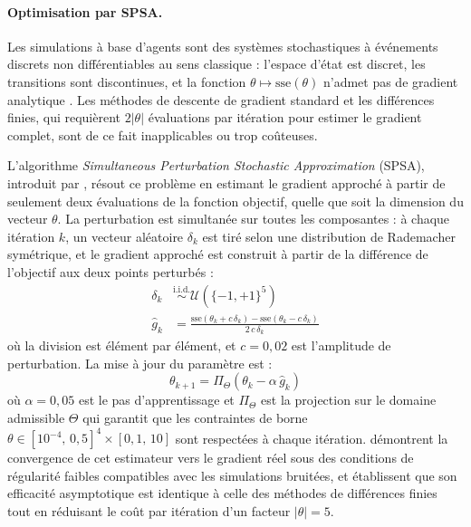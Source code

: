 \documentclass[11pt,a4paper,oneside]{report}
\theoremstyle{definition}
\theoremstyle{remark}
\begin{document}
\paragraph{Optimisation par SPSA.}
Les simulations à base d'agents sont des systèmes stochastiques à événements discrets non différentiables au sens classique : l'espace d'état est discret, les transitions sont discontinues, et la fonction $\theta \mapsto \text{sse}(\theta)$ n'admet pas de gradient analytique \citep{fu2002simulation}. Les méthodes de descente de gradient standard et les différences finies, qui requièrent $2|\theta|$ évaluations par itération pour estimer le gradient complet, sont de ce fait inapplicables ou trop coûteuses.

L'algorithme \textit{Simultaneous Perturbation Stochastic Approximation} (SPSA), introduit par \citet{spall1992spsa}, résout ce problème en estimant le gradient approché à partir de seulement deux évaluations de la fonction objectif, quelle que soit la dimension du vecteur $\theta$. La perturbation est simultanée sur toutes les composantes : à chaque itération $k$, un vecteur aléatoire $\delta_k$ est tiré selon une distribution de Rademacher symétrique, et le gradient approché est construit à partir de la différence de l'objectif aux deux points perturbés :
\begin{align}
    \delta_k &\overset{\text{i.i.d.}}{\sim} \mathcal{U}\!\left(\{-1,+1\}^5\right) \\[4pt]
    \hat{g}_k &= \frac{\text{sse}\!\left(\theta_k + c\,\delta_k\right) - \text{sse}\!\left(\theta_k - c\,\delta_k\right)}{2\,c\,\delta_k}
\end{align}
où la division est élément par élément, et $c = 0{,}02$ est l'amplitude de perturbation. La mise à jour du paramètre est :
\begin{equation}
    \theta_{k+1} = \Pi_\Theta\!\left(\theta_k - \alpha\,\hat{g}_k\right)
\end{equation}
où $\alpha = 0{,}05$ est le pas d'apprentissage et $\Pi_\Theta$ est la projection sur le domaine admissible $\Theta$ qui garantit que les contraintes de borne $\theta \in [10^{-4},\, 0{,}5]^4 \times [0{,}1,\, 10]$ sont respectées à chaque itération. \citet{spall1992spsa} démontrent la convergence de cet estimateur vers le gradient réel sous des conditions de régularité faibles compatibles avec les simulations bruitées, et établissent que son efficacité asymptotique est identique à celle des méthodes de différences finies tout en réduisant le coût par itération d'un facteur $|\theta| = 5$.
\end{document}
